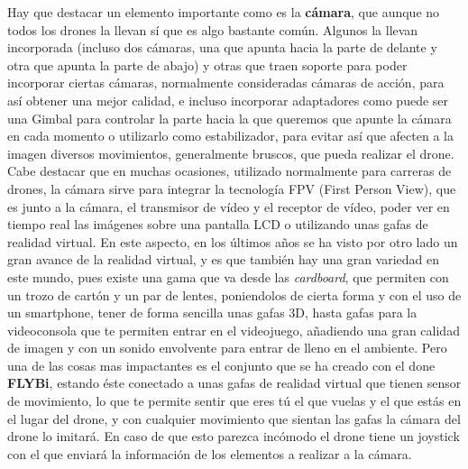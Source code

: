 \hspace{1 cm} Hay que destacar un elemento importante como es la \textbf{c\'amara}, que aunque no todos los drones la llevan s\'i que es algo bastante com\'un. Algunos la llevan incorporada (incluso dos c\'amaras, una que apunta hacia la parte de delante y otra que apunta la parte de abajo) y otras que traen soporte para poder incorporar ciertas c\'amaras, normalmente consideradas c\'amaras de acci\'on, para as\'i obtener una mejor calidad, e incluso incorporar adaptadores como puede ser una Gimbal para controlar la parte hacia la que queremos que apunte la c\'amara en cada momento o utilizarlo como estabilizador, para evitar as\'i que afecten a la imagen diversos movimientos, generalmente bruscos, que pueda realizar el drone. Cabe destacar que en muchas ocasiones, utilizado normalmente para carreras de drones, la c\'amara sirve para integrar la tecnolog\'ia FPV (First Person View), que es junto a la c\'amara, el transmisor de v\'ideo y el receptor de v\'ideo, poder ver en tiempo real las im\'agenes sobre una pantalla LCD o utilizando unas gafas de realidad virtual. En este aspecto, en los \'ultimos años se ha visto por otro lado un gran avance de la realidad virtual, y es que tambi\'en hay una gran variedad en este mundo, pues existe una gama que va desde las \emph{cardboard}, que permiten con un trozo de cart\'on y un par de lentes, poniendolos de cierta forma y con el uso de un smartphone, tener de forma sencilla unas gafas 3D, hasta gafas para la videoconsola que te permiten entrar en el videojuego, añadiendo una gran calidad de imagen y con un sonido envolvente para entrar de lleno en el ambiente. Pero una de las cosas mas impactantes es el conjunto que se ha creado con el done \textbf{FLYBi}, estando \'este conectado a unas gafas de realidad virtual que tienen sensor de movimiento, lo que te permite sentir que eres t\'u el que vuelas y el que est\'as en el lugar del drone, y con cualquier movimiento que sientan las gafas la c\'amara del drone lo imitar\'a. En caso de que esto parezca inc\'omodo el drone tiene un joystick con el que enviar\'a la informaci\'on de los elementos a realizar a la c\'amara. 
 

